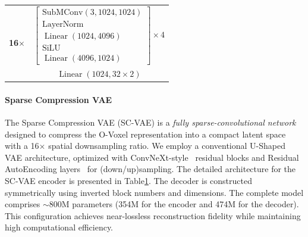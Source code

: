 \documentclass[10pt,twocolumn,letterpaper]{article}
\newcommand{\paravspace}{\vspace{-11pt}}
\begin{document}
\begin{table}
\begin{tabular}{c|c}
        \midrule  
            \multirow{2}{*}{\textbf{16$\times$}} & $\left[\begin{matrix}\operatorname{SubMConv(3, 1024, 1024)}\\\operatorname{LayerNorm}\\\operatorname{Linear}(1024,4096)\\\operatorname{SiLU}\\\operatorname{Linear}(4096,1024)\end{matrix}\right]\times4$  \\
            & $\operatorname{Linear}(1024, 32\times2)$ \\
        \bottomrule
    \end{tabular}  
    \label{tab:scvae_detail} 
\end{table}

\paragraph{Sparse Compression VAE} The Sparse Compression VAE (SC-VAE) is a \emph{fully sparse-convolutional network} designed to compress the O-Voxel representation into a compact latent space with a 16$\times$ spatial downsampling ratio. We employ a conventional U-Shaped VAE architecture, optimized with ConvNeXt-style~\cite{liu2022convnet} residual blocks and Residual AutoEncoding layers~\cite{chen2024deep} for (down/up)sampling. The detailed architecture for the SC-VAE encoder is presented in Table\ref{tab:scvae_detail}. The decoder is constructed symmetrically using inverted block numbers and dimensions.
The complete model comprises $\sim$800M parameters (354M for the encoder and 474M for the decoder). This configuration achieves near-lossless reconstruction fidelity while maintaining high computational efficiency.

\paravspace
\end{document}
